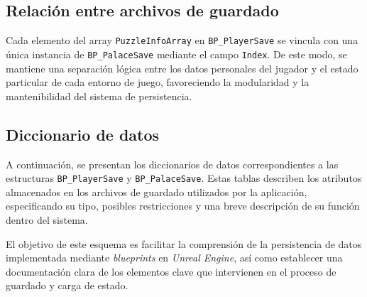 \subsection*{Relación entre archivos de guardado}

Cada elemento del array \texttt{PuzzleInfoArray} en \texttt{BP\_PlayerSave} se vincula con una única instancia de \texttt{BP\_PalaceSave} mediante el campo \texttt{Index}. De este modo, se mantiene una separación lógica entre los datos personales del jugador y el estado particular de cada entorno de juego, favoreciendo la modularidad y la mantenibilidad del sistema de persistencia.

\subsection{Diccionario de datos}
A continuación, se presentan los diccionarios de datos correspondientes a las estructuras \texttt{BP\_PlayerSave} y \texttt{BP\_PalaceSave}. Estas tablas describen los atributos almacenados en los archivos de guardado utilizados por la aplicación, especificando su tipo, posibles restricciones y una breve descripción de su función dentro del sistema.

El objetivo de este esquema es facilitar la comprensión de la persistencia de datos implementada mediante \textit{blueprints} en \textit{Unreal Engine}, así como establecer una documentación clara de los elementos clave que intervienen en el proceso de guardado y carga de estado.

